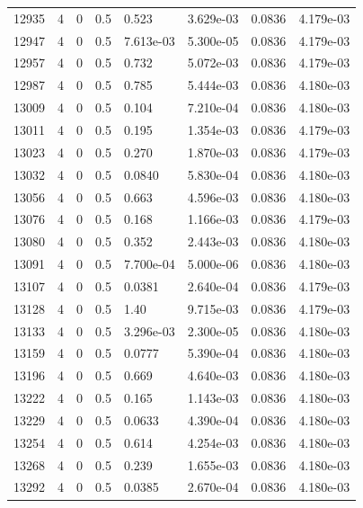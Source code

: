 \documentclass[preview]{standalone}
\begin{document}
{{{{{{{{{{{{{{\begin{tabular}{L{1.2cm}C{1.2cm} C{0.3cm}C{0.5cm} C{1.4cm}C{1.4cm} C{1.4cm}C{1.4cm}}
  12935  &     4  & 0     & 0.5 &  0.523  & 3.629e-03  & 0.0836 &  4.179e-03   \\ 
  12947  &     4  & 0     & 0.5 &  7.613e-03  & 5.300e-05  & 0.0836 &  4.179e-03   \\ 
  12957  &     4  & 0     & 0.5 &  0.732  & 5.072e-03  & 0.0836 &  4.179e-03   \\ 
  12987  &     4  & 0     & 0.5 &  0.785  & 5.444e-03  & 0.0836 &  4.180e-03   \\ 
  13009  &     4  & 0     & 0.5 &  0.104  & 7.210e-04  & 0.0836 &  4.180e-03   \\ 
  13011  &     4  & 0     & 0.5 &  0.195  & 1.354e-03  & 0.0836 &  4.179e-03   \\ 
  13023  &     4  & 0     & 0.5 &  0.270  & 1.870e-03  & 0.0836 &  4.179e-03   \\ 
  13032  &     4  & 0     & 0.5 &  0.0840  & 5.830e-04  & 0.0836 &  4.180e-03   \\ 
  13056  &     4  & 0     & 0.5 &  0.663  & 4.596e-03  & 0.0836 &  4.180e-03   \\ 
  13076  &     4  & 0     & 0.5 &  0.168  & 1.166e-03  & 0.0836 &  4.179e-03   \\ 
  13080  &     4  & 0     & 0.5 &  0.352  & 2.443e-03  & 0.0836 &  4.180e-03   \\ 
  13091  &     4  & 0     & 0.5 &  7.700e-04  & 5.000e-06  & 0.0836 &  4.180e-03   \\ 
  13107  &     4  & 0     & 0.5 &  0.0381  & 2.640e-04  & 0.0836 &  4.179e-03   \\ 
  13128  &     4  & 0     & 0.5 &  1.40  & 9.715e-03  & 0.0836 &  4.179e-03   \\ 
  13133  &     4  & 0     & 0.5 &  3.296e-03  & 2.300e-05  & 0.0836 &  4.180e-03   \\ 
  13159  &     4  & 0     & 0.5 &  0.0777  & 5.390e-04  & 0.0836 &  4.180e-03   \\ 
  13196  &     4  & 0     & 0.5 &  0.669  & 4.640e-03  & 0.0836 &  4.180e-03   \\ 
  13222  &     4  & 0     & 0.5 &  0.165  & 1.143e-03  & 0.0836 &  4.180e-03   \\ 
  13229  &     4  & 0     & 0.5 &  0.0633  & 4.390e-04  & 0.0836 &  4.180e-03   \\ 
  13254  &     4  & 0     & 0.5 &  0.614  & 4.254e-03  & 0.0836 &  4.180e-03   \\ 
  13268  &     4  & 0     & 0.5 &  0.239  & 1.655e-03  & 0.0836 &  4.180e-03   \\ 
  13292  &     4  & 0     & 0.5 &  0.0385  & 2.670e-04  & 0.0836 &  4.180e-03   \\ 

\end{tabular}}}}}}}}}}}}}}}
\end{document}
